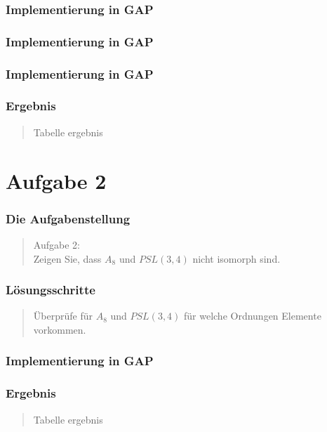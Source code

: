 \documentclass{beamer}
\begin{document}
\begin{frame}
	\frametitle{Implementierung in GAP}
	 
		 
\end{frame}

\begin{frame}
	\frametitle{Implementierung in GAP}
	 
		 
\end{frame}

\begin{frame}
	\frametitle{Implementierung in GAP}
	 
		 
\end{frame}

\begin{frame}
	\frametitle{Ergebnis}
	\begin{quote}
	 Tabelle ergebnis
		 
	\end{quote}
\end{frame}



\section{Aufgabe 2}

\begin{frame}
	\frametitle{Die Aufgabenstellung}
	\begin{quote}
	Aufgabe 2:\\
	Zeigen Sie, dass $A_8$ und $ PSL(3,4)$ nicht isomorph sind.
		 
	\end{quote}
\end{frame}

\begin{frame}
	\frametitle{Lösungsschritte}
	\begin{quote}
	 Überprüfe für $A_8$ und $PSL(3,4)$ für welche Ordnungen Elemente vorkommen.
		 
	\end{quote}
\end{frame}

\begin{frame}
	\frametitle{Implementierung in GAP}
	
\end{frame}

\begin{frame}
	\frametitle{Ergebnis}
	\begin{quote}
	 Tabelle ergebnis
		 
	\end{quote}
\end{frame}
\end{document}
